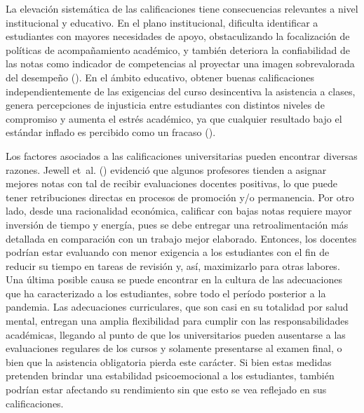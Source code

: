 \documentclass[
  spanish,
  a4paper,
  oneside]{scrbook}
\begin{document}
La elevación sistemática de las calificaciones tiene consecuencias
relevantes a nivel institucional y educativo. En el plano institucional,
dificulta identificar a estudiantes con mayores necesidades de apoyo,
obstaculizando la focalización de políticas de acompañamiento académico,
y también deteriora la confiabilidad de las notas como indicador de
competencias al proyectar una imagen sobrevalorada del desempeño
(). En el ámbito
educativo, obtener buenas calificaciones independientemente de las
exigencias del curso desincentiva la asistencia a clases, genera
percepciones de injusticia entre estudiantes con distintos niveles de
compromiso y aumenta el estrés académico, ya que cualquier resultado
bajo el estándar inflado es percibido como un fracaso
().

Los factores asociados a las calificaciones universitarias pueden
encontrar diversas razones. Jewell et~al.
() evidenció que algunos
profesores tienden a asignar mejores notas con tal de recibir
evaluaciones docentes positivas, lo que puede tener retribuciones
directas en procesos de promoción y/o permanencia. Por otro lado, desde
una racionalidad económica, calificar con bajas notas requiere mayor
inversión de tiempo y energía, pues se debe entregar una
retroalimentación más detallada en comparación con un trabajo mejor
elaborado. Entonces, los docentes podrían estar evaluando con menor
exigencia a los estudiantes con el fin de reducir su tiempo en tareas de
revisión y, así, maximizarlo para otras labores. Una última posible
causa se puede encontrar en la cultura de las adecuaciones que ha
caracterizado a los estudiantes, sobre todo el período posterior a la
pandemia. Las adecuaciones curriculares, que son casi en su totalidad
por salud mental, entregan una amplia flexibilidad para cumplir con las
responsabilidades académicas, llegando al punto de que los
universitarios pueden ausentarse a las evaluaciones regulares de los
cursos y solamente presentarse al examen final, o bien que la asistencia
obligatoria pierda este carácter. Si bien estas medidas pretenden
brindar una estabilidad psicoemocional a los estudiantes, también
podrían estar afectando su rendimiento sin que esto se vea reflejado en
sus calificaciones.
\end{document}
